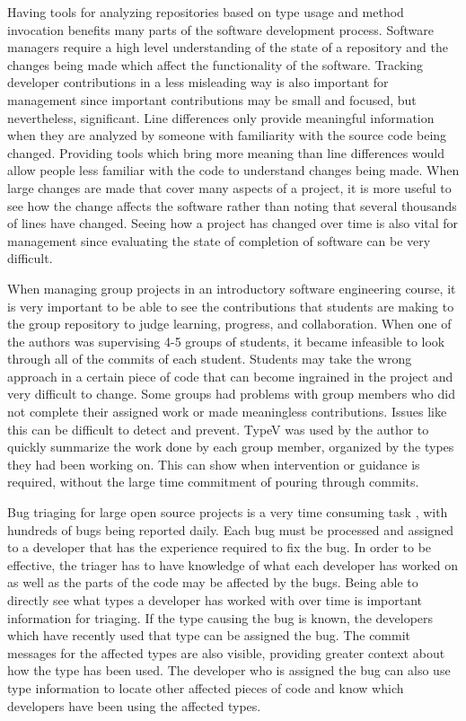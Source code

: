 Having tools for analyzing repositories based on type usage and method invocation benefits many parts of the software development process. Software managers require a high level understanding of the state of a repository and the changes being made which affect the functionality of the software. Tracking developer contributions in a less misleading way is also important for management since important contributions may be small and focused, but nevertheless, significant. Line differences only provide meaningful information when they are analyzed by someone with familiarity with the source code being changed. Providing tools which bring more meaning than line differences would allow people less familiar with the code to understand changes being made. When large changes are made that cover many aspects of a project, it is more useful to see how the change affects the software rather than noting that several thousands of lines have changed. Seeing how a project has changed over time is also vital for management since evaluating the state of completion of software can be very difficult.

When managing group projects in an introductory software engineering course, it is very important to be able to see the contributions that students are making to the group repository to judge learning, progress, and collaboration. When one of the authors was supervising 4-5 groups of students, it became infeasible to look through all of the commits of each student. Students may take the wrong approach in a certain piece of code that can become ingrained in the project and very difficult to change. Some groups had problems with group members who did not complete their assigned work or made meaningless contributions. Issues like this can be difficult to detect and prevent. TypeV was used by the author to quickly summarize the work done by each group member, organized by the types they had been working on. This can show when intervention or guidance is required, without the large time commitment of pouring through commits.


Bug triaging for large open source projects is a very time consuming task \cite{badashian2015}, with hundreds  of bugs being reported daily. Each bug must be processed and assigned to a developer that has the experience required to fix the bug. In order to be effective, the triager has to have knowledge of what each developer has worked on as well as the parts of the code may be affected by the bugs. Being able to directly see what types a developer has worked with over time is important information for triaging. If the type causing the bug is known, the developers which have recently used that type can be assigned the bug. The commit messages for the affected types are also visible, providing greater context about how the type has been used. The developer who is assigned the bug can also use type information to locate other affected pieces of code and know which developers have been using the affected types.


